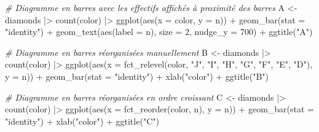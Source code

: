 \documentclass[
]{book}
\newenvironment{Shaded}{\begin{snugshade}}{\end{snugshade}}
\newcommand{\AttributeTok}[1]{\textcolor[rgb]{0.77,0.63,0.00}{#1}}
\newcommand{\CommentTok}[1]{\textcolor[rgb]{0.56,0.35,0.01}{\textit{#1}}}
\newcommand{\DecValTok}[1]{\textcolor[rgb]{0.00,0.00,0.81}{#1}}
\newcommand{\FunctionTok}[1]{\textcolor[rgb]{0.00,0.00,0.00}{#1}}
\newcommand{\NormalTok}[1]{#1}
\newcommand{\OtherTok}[1]{\textcolor[rgb]{0.56,0.35,0.01}{#1}}
\newcommand{\SpecialCharTok}[1]{\textcolor[rgb]{0.00,0.00,0.00}{#1}}
\newcommand{\StringTok}[1]{\textcolor[rgb]{0.31,0.60,0.02}{#1}}
\begin{document}
\begin{Shaded}
\begin{Highlighting}[]
\CommentTok{\# Diagramme en barres avec les effectifs affichés à proximité des barres}
\NormalTok{A }\OtherTok{\textless{}{-}} 
\NormalTok{  diamonds }\SpecialCharTok{|\textgreater{}}
  \FunctionTok{count}\NormalTok{(color) }\SpecialCharTok{|\textgreater{}}
  \FunctionTok{ggplot}\NormalTok{(}\FunctionTok{aes}\NormalTok{(}\AttributeTok{x =}\NormalTok{ color, }\AttributeTok{y =}\NormalTok{ n)) }\SpecialCharTok{+}
     \FunctionTok{geom\_bar}\NormalTok{(}\AttributeTok{stat =} \StringTok{"identity"}\NormalTok{) }\SpecialCharTok{+}
     \FunctionTok{geom\_text}\NormalTok{(}\FunctionTok{aes}\NormalTok{(}\AttributeTok{label =}\NormalTok{ n), }\AttributeTok{size =} \DecValTok{2}\NormalTok{, }\AttributeTok{nudge\_y =} \DecValTok{700}\NormalTok{) }\SpecialCharTok{+}
     \FunctionTok{ggtitle}\NormalTok{(}\StringTok{"A"}\NormalTok{)}

\CommentTok{\# Diagramme en barres réorganisées manuellement}
\NormalTok{B }\OtherTok{\textless{}{-}} 
\NormalTok{  diamonds }\SpecialCharTok{|\textgreater{}}
  \FunctionTok{count}\NormalTok{(color) }\SpecialCharTok{|\textgreater{}}
  \FunctionTok{ggplot}\NormalTok{(}\FunctionTok{aes}\NormalTok{(}\AttributeTok{x =} \FunctionTok{fct\_relevel}\NormalTok{(color, }\StringTok{"J"}\NormalTok{, }\StringTok{"I"}\NormalTok{, }\StringTok{"H"}\NormalTok{, }\StringTok{"G"}\NormalTok{, }\StringTok{"F"}\NormalTok{, }\StringTok{"E"}\NormalTok{, }\StringTok{"D"}\NormalTok{), }
             \AttributeTok{y =}\NormalTok{ n)) }\SpecialCharTok{+}
     \FunctionTok{geom\_bar}\NormalTok{(}\AttributeTok{stat =} \StringTok{"identity"}\NormalTok{) }\SpecialCharTok{+}
     \FunctionTok{xlab}\NormalTok{(}\StringTok{"color"}\NormalTok{) }\SpecialCharTok{+}
     \FunctionTok{ggtitle}\NormalTok{(}\StringTok{"B"}\NormalTok{) }

\CommentTok{\# Diagramme en barres réorganisées en ordre croissant}
\NormalTok{C }\OtherTok{\textless{}{-}} 
\NormalTok{  diamonds }\SpecialCharTok{|\textgreater{}}
  \FunctionTok{count}\NormalTok{(color) }\SpecialCharTok{|\textgreater{}}
  \FunctionTok{ggplot}\NormalTok{(}\FunctionTok{aes}\NormalTok{(}\AttributeTok{x =} \FunctionTok{fct\_reorder}\NormalTok{(color, n), }\AttributeTok{y =}\NormalTok{ n)) }\SpecialCharTok{+}
     \FunctionTok{geom\_bar}\NormalTok{(}\AttributeTok{stat =} \StringTok{"identity"}\NormalTok{) }\SpecialCharTok{+}
     \FunctionTok{xlab}\NormalTok{(}\StringTok{"color"}\NormalTok{) }\SpecialCharTok{+}
     \FunctionTok{ggtitle}\NormalTok{(}\StringTok{"C"}\NormalTok{) }


\end{Highlighting}
\end{Shaded}
\end{document}
